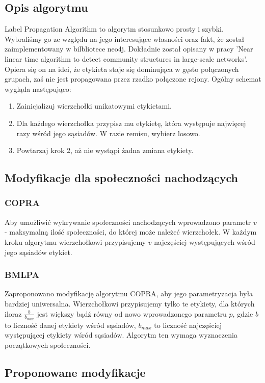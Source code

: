\documentclass{article}
\begin{document}
\subsection{Opis algorytmu}
Label Propagation Algorithm to algorytm stosunkowo prosty i szybki. Wybraliśmy go ze względu na jego interesujące własności oraz fakt, że został zaimplementowany w bilbliotece neo4j. Dokładnie został opisany w pracy 'Near linear time algorithm to detect community structures in large-scale networks'\cite{ms-paper2}. Opiera się on na idei, że etykieta staje się dominująca w gęsto połączonych grupach, zaś nie jest propagowana przez rzadko połączone rejony. Ogólny schemat wygląda następująco:
\begin{enumerate}
\item Zainicjalizuj wierzchołki unikatowymi etykietami.
\item Dla każdego wierzchołka przypisz mu etykietę, która występuje najwięcej razy wśród jego sąsiadów. W razie remisu, wybierz losowo.
\item Powtarzaj krok 2, aż nie wystąpi żadna zmiana etykiety.
\end{enumerate}

\subsection{Modyfikacje dla społeczności nachodzących}
\subsubsection{COPRA}
Aby umożliwić wykrywanie społeczności nachodzących wprowadzono parametr $v$ - maksymalną ilość społeczności, do której może należeć wierzchołek\cite{ms-paper3}. W każdym kroku algorytmu wierzchołkowi przypisujemy $v$ najczęściej występujących wśród jego sąsiadów etykiet.
\subsubsection{BMLPA}
Zaproponowano modyfikację algorytmu COPRA, aby jego parametryzacja była bardziej uniwersalna\cite{ms-paper4}. Wierzchołkowi przypisujemy tylko te etykiety, dla których iloraz $\frac{b}{b_{max}}$ jest większy bądź równy od nowo wprowadzonego parametru $p$, gdzie $b$ to liczność danej etykiety wśród sąsiadów, $b_{max}$ to liczność najczęściej występującej etykiety wśród sąsiadów. Algorytm ten wymaga wyznaczenia początkowych społeczności.

\subsection{Proponowane modyfikacje}
\end{document}
